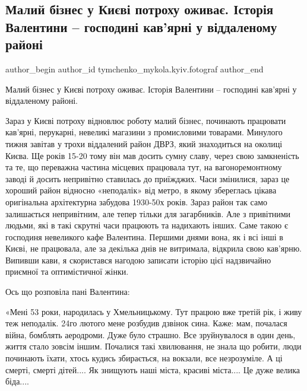  
 
 
 
 

\subsection{Малий бізнес у Києві потроху оживає. Історія Валентини – господині кав'ярні у віддаленому районі}
\label{sec:28_03_2022.fb.tymchenko_mykola.kyiv.fotograf.1.malii_b_znes_u_ki_v_}

\ifcmt
 author_begin
   author_id tymchenko_mykola.kyiv.fotograf
 author_end
\fi

Малий бізнес у Києві потроху оживає. Історія Валентини – господині кав'ярні у віддаленому районі.

Зараз у Києві потроху відновлює роботу малий бізнес, починають працювати
кав'ярні, перукарні, невеликі магазини з промисловими товарами. Минулого тижня
завітав у трохи віддалений район ДВРЗ, який знаходиться на околиці Києва. Ще
років 15-20 тому він мав досить сумну славу, через свою замкненість та те, що
переважна частина місцевих працювала тут, на вагоноремонтному заводі й досить
непривітно ставилась до приїжджих. Часи змінилися, зараз це хороший район
відносно «неподалік» від метро, в якому збереглась цікава оригінальна
архітектурна забудова 1930-50х років. Зараз район так само залишається
непривітним, але тепер тільки для загарбників. Але з привітними людьми, які в
такі скрутні часи працюють та надихають інших. Саме такою є господиня
невеликого кафе Валентина. Першими днями вона, як і всі інші в Києві, не
працювала, але за декілька днів не витримала, відкрила свою кав'ярню. Випивши
кави, я скористався нагодою записати історію  цієї надзвичайно приємної та
оптимістичної жінки.

Ось що розповіла пані Валентина:

«Мені  53 роки, народилась у Хмельницькому. Тут працюю вже третій рік, і
живу теж неподалік. 24го лютого мене розбудив дзвінок сина. Каже: мам,
почалася війна, бомблять аеродроми. Дуже було страшно. Все зруйнувалося в
один день, життя стало зовсім іншим. Почалися такі хвилювання, не знала що
робити, люди починають їхати, хтось кудись збирається, на вокзали, все
незрозуміле. А ці смерті, смерті дітей.... Як знищують наші міста, красиві
міста.... Це дуже велика біда....

